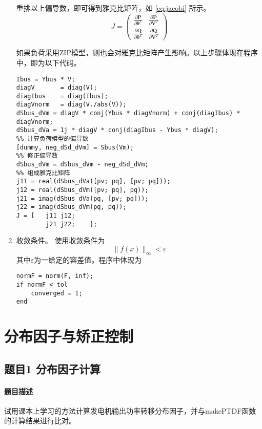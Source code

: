 \documentclass[a4paper,12pt]{article}
\newcommand{\vect}[1]{\boldsymbol{#1}}
\begin{document}
\begin{enumerate}
      重排以上偏导数，即可得到雅克比矩阵，如 \cref{eq:jacobi} 所示。
      \begin{equation}
        \label{eq:jacobi}
        J=\begin{pmatrix}
          \frac{\partial \vect{P}}{\partial \vect{\theta}^T} & \frac{\partial \vect{P}}{\partial \vect{V}^T}\\
          \frac{\partial \vect{Q}}{\partial \vect{\theta}^T} & \frac{\partial \vect{Q}}{\partial \vect{V}^T}
      \end{pmatrix}
      \end{equation}

      如果负荷采用ZIP模型，则也会对雅克比矩阵产生影响。以上步骤体现在程序中，即为以下代码。
      \begin{lstlisting}[style=Matlab-editor,basicstyle=\mlttfamily]
%% 计算偏导数
Ibus = Ybus * V;
diagV       = diag(V);
diagIbus    = diag(Ibus);
diagVnorm   = diag(V./abs(V));
dSbus_dVm = diagV * conj(Ybus * diagVnorm) + conj(diagIbus) * diagVnorm;
dSbus_dVa = 1j * diagV * conj(diagIbus - Ybus * diagV);
%% 计算负荷模型的偏导数
[dummy, neg_dSd_dVm] = Sbus(Vm);
%% 修正偏导数
dSbus_dVm = dSbus_dVm - neg_dSd_dVm;
%% 组成雅克比矩阵
j11 = real(dSbus_dVa([pv; pq], [pv; pq]));
j12 = real(dSbus_dVm([pv; pq], pq));
j21 = imag(dSbus_dVa(pq, [pv; pq]));
j22 = imag(dSbus_dVm(pq, pq));
J = [   j11 j12;
        j21 j22;    ];
      \end{lstlisting}
      \item 收敛条件。
      使用收敛条件为
      \begin{equation}
        \parallel f(x) \parallel_\infty < \varepsilon
      \end{equation}
      其中$\varepsilon$为一给定的容差值。程序中体现为
      \begin{lstlisting}[style=Matlab-editor,basicstyle=\mlttfamily]
normF = norm(F, inf);
if normF < tol
    converged = 1;
end
      \end{lstlisting}
    \end{enumerate}

    \section{分布因子与矫正控制}
    \subsection{题目1 分布因子计算}
    \paragraph{题目描述} 试用课本上学习的方法计算发电机输出功率转移分布因子，并与makePTDF函数的计算结果进行比对。
\end{document}
